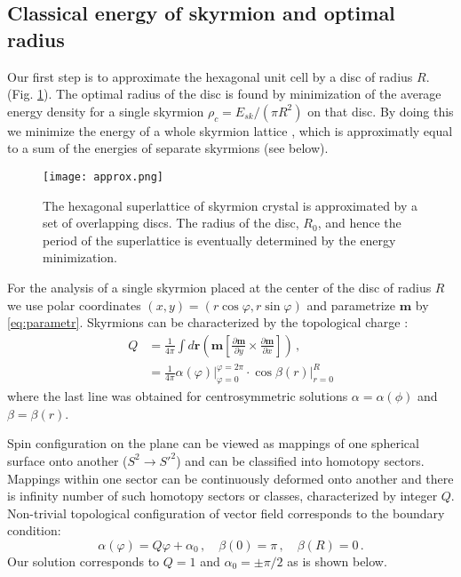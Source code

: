 \documentclass[aps,prb,twocolumn,superscriptaddress,nobalancelastpage]{revtex4-1}
\begin{document}
\subsection{Classical energy of skyrmion and optimal radius 
\label{sec:radius}}

Our first step is to approximate the hexagonal unit cell by a disc of radius $R$. (Fig. \ref{pic:approxHexagone}). The optimal radius of the disc is found by minimization of  the average energy density for a single skyrmion $\rho_{c} = E_{sk}/ (\pi R^{2})$ on that disc. By doing this we minimize the energy of a whole skyrmion lattice \cite{Han2010}, which is approximatly equal to a sum of the energies of separate skyrmions (see below). 

\begin{figure}[t]
\texttt{[image: approx.png]}
\caption{ \label{pic:approxHexagone}
The hexagonal superlattice of skyrmion crystal is approximated by a set of overlapping discs. The radius of the disc, $R_0$, and hence the period of the superlattice is eventually determined by the energy minimization.}
\end{figure}
 
For the analysis of a single skyrmion placed at the center of the disc of  radius $R$ we use polar coordinates $(x,y) = (r\cos \varphi, r \sin \varphi)$ and parametrize $\mathbf{m}$ by \eqref{eq:parametr}. 
Skyrmions  can be characterized by the  topological charge \cite{book:rajaraman}:
\begin{equation}
\begin{aligned}
Q & = \frac{1}{4\pi }
\int d\mathbf{r}\left( \mathbf{m}\left[ \frac{\partial \mathbf{m}}{\partial y} \times \frac{\partial \mathbf{m}}{\partial x} \right] \right)  \, , \\
& =   \frac1{4\pi}
\alpha \left( \varphi  \right) \big|_{\varphi  = 0}^{\varphi  = 2\pi }  \cdot 
 \cos \beta \left( r \right) \big|_{r = 0}^{ R}
\end{aligned}
\label{eq:topCharge}
\end{equation}
where the last line was obtained for centrosymmetric solutions $\alpha = \alpha(\phi)$ and $\beta = \beta (r)$.  
 
Spin configuration on the plane  can be viewed as mappings of one spherical surface onto another ($S^2 \rightarrow S'^2$) and can be classified into homotopy sectors.  \cite{book:rajaraman} 
Mappings within one sector can be continuously deformed onto another and there is infinity number of such homotopy sectors or classes,  characterized by integer $Q$. Non-trivial topological configuration of vector field corresponds to the boundary condition:
\begin{equation}
  {\alpha \left( \varphi  \right) = Q\varphi  + {\alpha _0}} \,, \quad 
  {\beta (0) = \pi } \,, \quad
  {\beta ({R}) = 0} \,.
\label{eq:edgeCond}
\end{equation}
Our solution corresponds to $Q=1$ and  $\alpha _{0} = \pm \pi/2$ as is shown below.   
\end{document}
